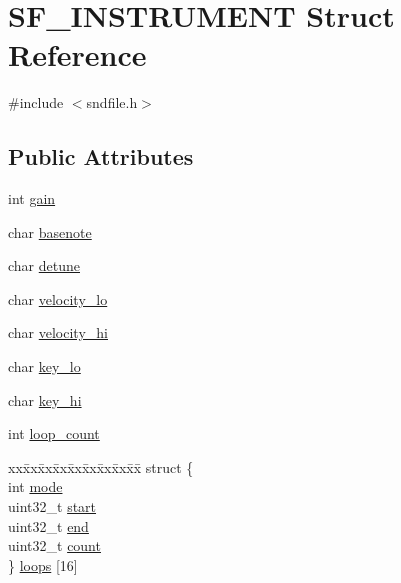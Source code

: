 \hypertarget{struct_s_f___i_n_s_t_r_u_m_e_n_t}{}\section{S\+F\+\_\+\+I\+N\+S\+T\+R\+U\+M\+E\+NT Struct Reference}
\label{struct_s_f___i_n_s_t_r_u_m_e_n_t}


{\ttfamily \#include $<$sndfile.\+h$>$}

\subsection*{Public Attributes}
\begin{DoxyCompactItemize}
\item 
int \mbox{\hyperlink{struct_s_f___i_n_s_t_r_u_m_e_n_t_a1c157f314b852c291150feab66f1f7fe}{gain}}
\item 
char \mbox{\hyperlink{struct_s_f___i_n_s_t_r_u_m_e_n_t_ab131f2d1e1297b20b9b64596bd9fef2c}{basenote}}
\item 
char \mbox{\hyperlink{struct_s_f___i_n_s_t_r_u_m_e_n_t_a15c6ebfa70d434dae34742c58a8ef9bf}{detune}}
\item 
char \mbox{\hyperlink{struct_s_f___i_n_s_t_r_u_m_e_n_t_a3637643126becba84608741033f91f47}{velocity\+\_\+lo}}
\item 
char \mbox{\hyperlink{struct_s_f___i_n_s_t_r_u_m_e_n_t_a4e1435a98a085a8df95f10ff1bed536f}{velocity\+\_\+hi}}
\item 
char \mbox{\hyperlink{struct_s_f___i_n_s_t_r_u_m_e_n_t_a9c59a466ad6937c6d6a5134a642aae6c}{key\+\_\+lo}}
\item 
char \mbox{\hyperlink{struct_s_f___i_n_s_t_r_u_m_e_n_t_ac5d3d85d2218849b73620cb1a70ea609}{key\+\_\+hi}}
\item 
int \mbox{\hyperlink{struct_s_f___i_n_s_t_r_u_m_e_n_t_a070427d027c390e850951c83bda44d07}{loop\+\_\+count}}
\item 
\begin{tabbing}
xx\=xx\=xx\=xx\=xx\=xx\=xx\=xx\=xx\=\kill
struct \{\\
\>int \mbox{\hyperlink{struct_s_f___i_n_s_t_r_u_m_e_n_t_af222d1a939525fe44aa377ff764570be}{mode}}\\
\>uint32\_t \mbox{\hyperlink{struct_s_f___i_n_s_t_r_u_m_e_n_t_a1b0a90272231ed2a6f40cad3e29f5039}{start}}\\
\>uint32\_t \mbox{\hyperlink{struct_s_f___i_n_s_t_r_u_m_e_n_t_a1840d3fe21d83e9d40f56e513d201019}{end}}\\
\>uint32\_t \mbox{\hyperlink{struct_s_f___i_n_s_t_r_u_m_e_n_t_a5b7a619e1135f3a0cba1d68e8855c968}{count}}\\
\} \mbox{\hyperlink{struct_s_f___i_n_s_t_r_u_m_e_n_t_a14f72f0c1ef4df99870f5eaa22883cea}{loops}} \mbox{[}16\mbox{]}\\

\end{tabbing}\end{DoxyCompactItemize}


